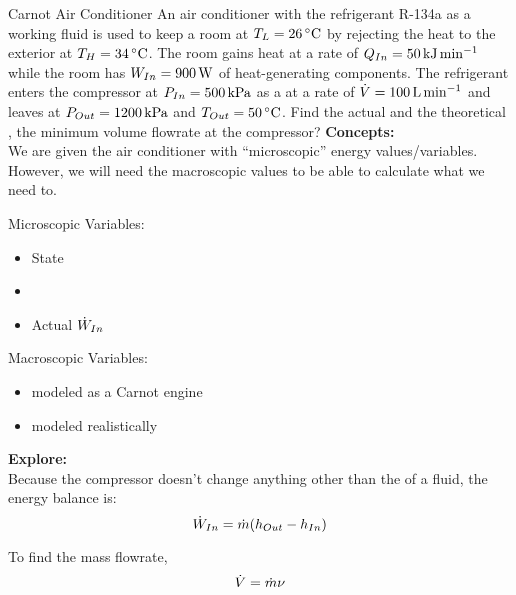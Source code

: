 \begin{example}{Carnot Air Conditioner}
  An air conditioner with the refrigerant R-134a as a working fluid is used to keep a room at $\Temp_{L} = \SI{26}{\degreeCelsius}$ by rejecting the heat to the exterior at $\Temp_{H} = \SI{34}{\degreeCelsius}$.
  The room gains heat at a rate of $Q_{In} = \SI{50}{\kilo\joule\per\minute}$ while the room has $W_{In} = \SI{900}{\watt}$ of heat-generating components.
  The refrigerant enters the compressor at $P_{In} = \SI{500}{\kilo\pascal}$ as a  at a rate of $\dot{V} = \SI{100}{\liter\per\minute}$ and leaves at $P_{Out} = \SI{1200}{\kilo\pascal}$ and $\Temp_{Out} = \SI{50}{\degreeCelsius}$.
  Find the actual and the theoretical , the minimum volume flowrate at the compressor?
  \tcblower{}
  \textbf{Concepts:} \\
  We are given the air conditioner with ``microscopic'' energy values/variables.
  However, we will need the macroscopic values to be able to calculate what we need to.

  Microscopic Variables:
  \begin{itemize}[noitemsep]
  \item State
  \item {}
  \item Actual $\dot{W}_{In}$
  \end{itemize}

  Macroscopic Variables:
  \begin{itemize}[noitemsep]
  \item {} modeled as a Carnot engine
  \item {} modeled realistically
  \end{itemize}

  \textbf{Explore:} \\
  Because the compressor doesn't change anything other than the  of a fluid, the energy balance is:
  \begin{equation*}
    \dot{W}_{In} = \dot{m}(h_{Out}- h_{In})
  \end{equation*}

  To find the mass flowrate,
  \begin{equation*}
    \dot{V} = \dot{m} \nu
  \end{equation*}


\end{example}
